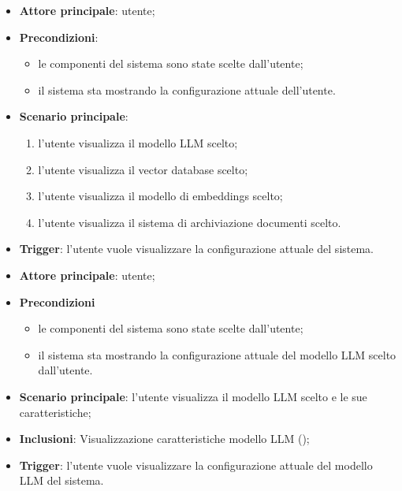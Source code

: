\documentclass[10pt, a4paper]{article}
\begin{document}
    \begin{itemize}
        \item \textbf{Attore principale}: utente;
        \item \textbf{Precondizioni}: 
        \begin{itemize}
            \item le componenti del sistema sono state scelte dall'utente;
            \item il sistema sta mostrando la configurazione attuale dell'utente.
        \end{itemize}
        \item \textbf{Scenario principale}:
            \begin{enumerate}
                \item l’utente visualizza il modello LLM scelto;
                \item l’utente visualizza il vector database scelto;
                \item l’utente visualizza il modello di embeddings scelto;
                \item l’utente visualizza il sistema di archiviazione documenti scelto.
            \end{enumerate}
        \item \textbf{Trigger}: l’utente vuole visualizzare la configurazione attuale del sistema.
    \end{itemize}

    \begin{itemize}
        \item \textbf{Attore principale}: utente;
        \item \textbf{Precondizioni}
        \begin{itemize}
            \item le componenti del sistema sono state scelte dall'utente;
            \item il sistema sta mostrando la configurazione attuale del modello LLM scelto dall'utente.
        \end{itemize}
        \item \textbf{Scenario principale}: l’utente visualizza il modello LLM scelto e le sue caratteristiche;
        \item \textbf{Inclusioni}: Visualizzazione caratteristiche modello LLM ();
        \item \textbf{Trigger}: l’utente vuole visualizzare la configurazione attuale del modello LLM del sistema.
    \end{itemize}
\end{document}
